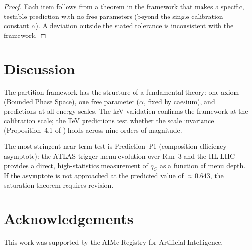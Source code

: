 \documentclass[twocolumn,10pt,a4paper]{article}
\theoremstyle{thmstyle}
\theoremstyle{definition}
\theoremstyle{remark}
\newcommand{\etaC}{\eta_{C}}
\begin{document}
\begin{proof}
Each item follows from a theorem in the framework that makes a specific,
testable prediction with no free parameters (beyond the single
calibration constant $\alpha$). A deviation outside the stated tolerance
is inconsistent with the framework.
\end{proof}

\section{Discussion}
\label{sec:disc}

The partition framework has the structure of a fundamental theory:
one axiom (Bounded Phase Space), one free parameter ($\alpha$, fixed by
caesium), and predictions at all energy scales. The keV validation
confirms the framework at the calibration scale; the TeV predictions
test whether the scale invariance (Proposition~4.1 of
\citealt{companion:spectrometer}) holds across nine orders of magnitude.

The most stringent near-term test is Prediction~P1 (composition efficiency
asymptote): the ATLAS trigger menu evolution over Run~3 and the HL-LHC
provides a direct, high-statistics measurement of $\etaC$ as a function
of menu depth. If the asymptote is not approached at the predicted value
of $\approx 0.643$, the saturation theorem requires revision.

\section*{Acknowledgements}
This work was supported by the AIMe Registry for Artificial Intelligence.



\end{document}

